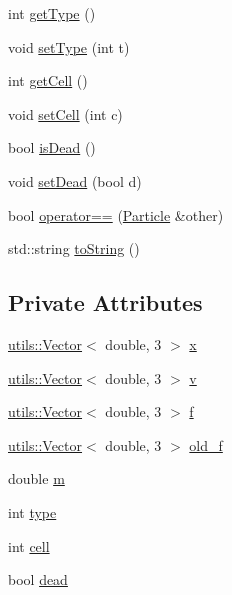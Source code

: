 \begin{DoxyCompactItemize}
int \hyperlink{classSimulation_1_1Particle_a0581d7b629eb17ac5bef8e934852ca8b}{get\-Type} ()
\item 
void \hyperlink{classSimulation_1_1Particle_a03487469e558306b9d770fb547ab23a3}{set\-Type} (int t)
\item 
int \hyperlink{classSimulation_1_1Particle_a7e74baf0c324e1474f6e5a4a072e5e8b}{get\-Cell} ()
\item 
void \hyperlink{classSimulation_1_1Particle_a701c977a46c66ac52c901eb9ee517389}{set\-Cell} (int c)
\item 
bool \hyperlink{classSimulation_1_1Particle_ad7e67d88e429c99eb06041e10be900af}{is\-Dead} ()
\item 
void \hyperlink{classSimulation_1_1Particle_ab18da20b918e57304510f5c2c778836a}{set\-Dead} (bool d)
\item 
bool \hyperlink{classSimulation_1_1Particle_a5034babb77618a56e00927d8891afabe}{operator==} (\hyperlink{classSimulation_1_1Particle}{Particle} \&other)
\item 
std\-::string \hyperlink{classSimulation_1_1Particle_a07d071a0f91f8ce7413201a6db3afe7b}{to\-String} ()
\end{DoxyCompactItemize}
\subsection*{Private Attributes}
\begin{DoxyCompactItemize}
\item 
\hyperlink{classutils_1_1Vector}{utils\-::\-Vector}$<$ double, 3 $>$ \hyperlink{classSimulation_1_1Particle_a37114cf327ef0591939f157489434bde}{x}
\item 
\hyperlink{classutils_1_1Vector}{utils\-::\-Vector}$<$ double, 3 $>$ \hyperlink{classSimulation_1_1Particle_aedd9ec08978292732fc38dd6d93dc3b4}{v}
\item 
\hyperlink{classutils_1_1Vector}{utils\-::\-Vector}$<$ double, 3 $>$ \hyperlink{classSimulation_1_1Particle_a54c7b7f1cb33876abdbd505d06c9b499}{f}
\item 
\hyperlink{classutils_1_1Vector}{utils\-::\-Vector}$<$ double, 3 $>$ \hyperlink{classSimulation_1_1Particle_a80cc4684069bff79cb7d91c25237141f}{old\-\_\-f}
\item 
double \hyperlink{classSimulation_1_1Particle_ad2b7f1d70b9aebd312af856c82fae6a8}{m}
\item 
int \hyperlink{classSimulation_1_1Particle_aeb6388e2a21c03c7e1582eb4eeb5efb3}{type}
\item 
int \hyperlink{classSimulation_1_1Particle_aebbb649086b757029a513e09adf76d4b}{cell}
\item 
bool \hyperlink{classSimulation_1_1Particle_a5decd76356cb024d1051cf01055ec53f}{dead}
\end{DoxyCompactItemize}


